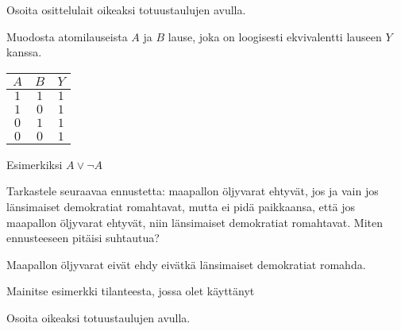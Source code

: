 \begin{kotitehtavasivu}
\begin{tehtava}
	Osoita osittelulait
	oikeaksi totuustaulujen avulla.
\end{tehtava}

\begin{tehtava}
	Muodosta atomilauseista $A$ ja $B$ lause, joka on
	loogisesti ekvivalentti lauseen $Y$ kanssa.
	\begin{center}
	\begin{tabular}{|c|c|c|}\hline
	$A$ & $B$ & $Y$\\ \hline
	$1$ & $1$ & $1$\\
	$1$ & $0$ & $1$\\
	$0$ & $1$ & $1$\\

	$0$ & $0$ & $1$\\ \hline
	\end{tabular}
	\end{center}
	
	\begin{vastaus}
	Esimerkiksi $A \lor \lnot A$
	\end{vastaus}
\end{tehtava}

\begin{tehtava}
	Tarkastele seuraavaa ennustetta: maapallon öljyvarat ehtyvät, jos ja vain jos länsimaiset demokratiat romahtavat, mutta ei pidä paikkaansa, että jos maapallon
	öljyvarat ehtyvät, niin länsimaiset demokratiat romahtavat. Miten ennusteeseen pitäisi suhtautua?
	
	\begin{vastaus}
	Maapallon öljyvarat eivät ehdy eivätkä länsimaiset demokratiat romahda.
	\end{vastaus}
\end{tehtava}

\begin{tehtava}
	Mainitse esimerkki tilanteesta, jossa olet käyttänyt
\end{tehtava}

\begin{tehtava}
	Osoita
	oikeaksi totuustaulujen avulla.
\end{tehtava}


\end{kotitehtavasivu}
